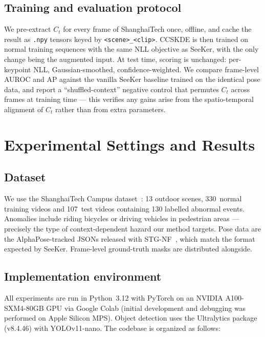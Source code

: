 \documentclass{article}
\begin{document}
\subsection{Training and evaluation protocol}
\label{ssec:protocol}
We pre-extract $C_t$ for every frame of ShanghaiTech once, offline, and
cache the result as \texttt{.npy} tensors keyed by \texttt{<scene>\_<clip>}.
CCSKDE is then trained on normal training sequences with the same NLL
objective as SeeKer, with the only change being the augmented input. At
test time, scoring is unchanged: per-keypoint NLL, Gaussian-smoothed,
confidence-weighted. We compare frame-level AUROC and AP against the
vanilla SeeKer baseline trained on the identical pose data, and report a
``shuffled-context'' negative control that permutes $C_t$ across frames
at training time --- this verifies any gains arise from the spatio-temporal
alignment of $C_t$ rather than from extra parameters.

\section{Experimental Settings and Results}
\label{sec:experiments}

\subsection{Dataset}
We use the ShanghaiTech Campus dataset~\citep{liu2018future}: 13 outdoor
scenes, 330~normal training videos and 107~test videos containing 130
labelled abnormal events. Anomalies include riding bicycles or driving
vehicles in pedestrian areas --- precisely the type of context-dependent
hazard our method targets. Pose data are the AlphaPose-tracked
JSONs released with STG-NF~\citep{hirschorn2023normalizing}, which match
the format expected by SeeKer. Frame-level ground-truth masks are
distributed alongside.

\subsection{Implementation environment}
All experiments are run in Python~3.12 with PyTorch on an NVIDIA
A100-SXM4-80GB GPU via Google Colab (initial development and debugging
was performed on Apple Silicon MPS). Object detection uses the
Ultralytics package (v8.4.46) with YOLOv11-nano. The codebase is organized
as follows:
\end{document}

